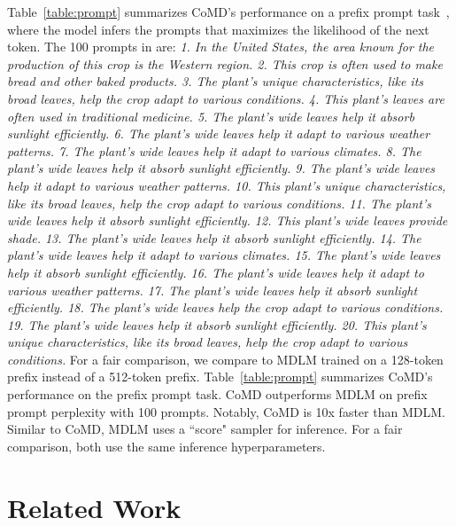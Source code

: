 \documentclass{article} %
\begin{document}
Table~\ref{table:prompt} summarizes CoMD's performance on a prefix prompt task~\citep{liao-etal-2020-probabilistically}, where the model infers the prompts that maximizes the likelihood of the next token. The 100 prompts in \citet{shih2022training} are: \textit{1. In the United States, the area known for the production of this crop is the Western region. 2. This crop is often used to make bread and other baked products. 3. The plant's unique characteristics, like its broad leaves, help the crop adapt to various conditions. 4. This plant's leaves are often used in traditional medicine. 5. The plant's wide leaves help it absorb sunlight efficiently. 6. The plant's wide leaves help it adapt to various weather patterns. 7. The plant's wide leaves help it adapt to various climates. 8. The plant's wide leaves help it absorb sunlight efficiently. 9. The plant's wide leaves help it adapt to various weather patterns. 10. This plant's unique characteristics, like its broad leaves, help the crop adapt to various conditions. 11. The plant's wide leaves help it absorb sunlight efficiently. 12. This plant's wide leaves provide shade. 13. The plant's wide leaves help it absorb sunlight efficiently. 14. The plant's wide leaves help it adapt to various climates. 15. The plant's wide leaves help it absorb sunlight efficiently. 16. The plant's wide leaves help it adapt to various weather patterns. 17. The plant's wide leaves help it absorb sunlight efficiently. 18. The plant's wide leaves help the crop adapt to various conditions. 19. The plant's wide leaves help it absorb sunlight efficiently. 20. This plant's unique characteristics, like its broad leaves, help the crop adapt to various conditions.} For a fair comparison, we compare to MDLM trained on a 128-token prefix instead of a 512-token prefix.  Table~\ref{table:prompt} summarizes CoMD's performance on the prefix prompt task. CoMD outperforms MDLM on prefix prompt perplexity with 100 prompts. Notably, CoMD is 10x faster than MDLM. Similar to CoMD, MDLM uses a ``score" sampler for inference. For a fair comparison, both use the same inference hyperparameters. 


\section{Related Work}
\end{document}
